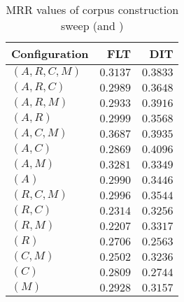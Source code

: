 
\begin{table}
\begin{spacing}{1.2}
\centering
\caption{MRR values of \openjpa corpus construction sweep (\cone and \ctwo)}
\label{table:openjpa_corpus_sweep}
\vspace{0.2em}
\begin{tabular}{lrr}
\toprule
Configuration &           FLT &           DIT \\
\midrule
  $(A,R,C,M)$ &      $0.3137$ &      $0.3833$ \\
    $(A,R,C)$ &      $0.2989$ &      $0.3648$ \\
    $(A,R,M)$ &      $0.2933$ &      $0.3916$ \\
      $(A,R)$ &      $0.2999$ &      $0.3568$ \\
    $(A,C,M)$ & $\bm{0.3687}$ &      $0.3935$ \\
      $(A,C)$ &      $0.2869$ & $\bm{0.4096}$ \\
      $(A,M)$ &      $0.3281$ &      $0.3349$ \\
        $(A)$ &      $0.2990$ &      $0.3446$ \\
    $(R,C,M)$ &      $0.2996$ &      $0.3544$ \\
      $(R,C)$ &      $0.2314$ &      $0.3256$ \\
      $(R,M)$ &      $0.2207$ &      $0.3317$ \\
        $(R)$ &      $0.2706$ &      $0.2563$ \\
      $(C,M)$ &      $0.2502$ &      $0.3236$ \\
        $(C)$ &      $0.2809$ &      $0.2744$ \\
        $(M)$ &      $0.2928$ &      $0.3157$ \\
\bottomrule
\end{tabular}

\end{spacing}
\end{table}
